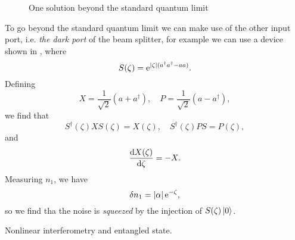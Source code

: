 \documentclass[hyperref, a4paper]{article}
\newcommand*{\ee}{\mathrm{e}}
\begin{document}
\begin{figure}
    \centering
    
    \caption{One solution beyond the standard quantum limit}
    \label{fig:beyond-sql}
\end{figure}

To go beyond the standard quantum limit we can make use of the other input port, i.e. \emph{the dark port} of the beam splitter, for example we can use a device shown in , where 
\begin{equation}
    S(\zeta) = \ee^{\abs*{\zeta} (a^\dagger a^\dagger - a a)}.
\end{equation}
Defining
\begin{equation}
    X = \frac{1}{\sqrt{2}} (a + a^\dagger), \quad P = \frac{1}{\sqrt{2}} (a - a^\dagger),
\end{equation}
we find that 
\begin{equation}
    S^\dagger(\zeta) X S(\zeta) = X(\zeta) , \quad S^\dagger(\zeta) P S = P(\zeta), 
\end{equation}
and 
\begin{equation}
    \dv{X(\zeta)}{\zeta} = - X.
\end{equation}
Measuring $n_1$, we have 
\begin{equation}
    \var{n}_1 = \abs*{\alpha} \ee^{-\zeta}, 
\end{equation}
so we find tha the noise is \emph{squeezed} by the injection of $S(\zeta) \ket*{0}$.

Nonlinear interferometry and entangled state.
\end{document}
